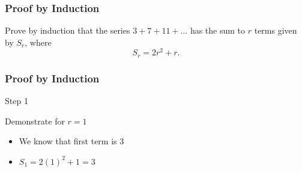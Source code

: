 \documentclass{beamer}
\begin{document}
\begin{frame}
\frametitle{Proof by Induction}
Prove by induction that the series $3 + 7 + 11 + \ldots$ has the sum to $r$
terms given by $S_r$, where
\[S_r = 2r^2 + r.\]

\end{frame}
\begin{frame}
\frametitle{Proof by Induction}
Step 1

Demonstrate for $r=1$
\begin{itemize}
\item We know that first term is 3 
\item $S_1  = 2(1)^2 + 1 = 3$
\end{itemize}

\end{frame}
\end{document}
